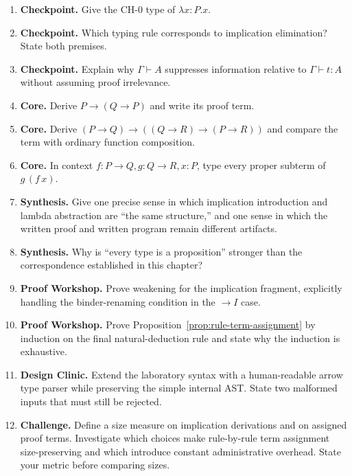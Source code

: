 \begin{enumerate}[label=\textbf{1.\arabic*.}]
\item \textbf{Checkpoint.} Give the $\mathrm{CH}\text{-}0$ type of $\lambda x{:}P.x$.
\item \textbf{Checkpoint.} Which typing rule corresponds to implication elimination? State both premises.
\item \textbf{Checkpoint.} Explain why $\Gamma\vdash A$ suppresses information relative to $\Gamma\vdash t:A$ without assuming proof irrelevance.
\item \textbf{Core.} Derive $P\to(Q\to P)$ and write its proof term.
\item \textbf{Core.} Derive $(P\to Q)\to((Q\to R)\to(P\to R))$ and compare the term with ordinary function composition.
\item \textbf{Core.} In context $f:P\to Q, g:Q\to R, x:P$, type every proper subterm of $g\,(f\,x)$.
\item \textbf{Synthesis.} Give one precise sense in which implication introduction and lambda abstraction are “the same structure,” and one sense in which the written proof and written program remain different artifacts.
\item \textbf{Synthesis.} Why is “every type is a proposition” stronger than the correspondence established in this chapter?
\item \textbf{Proof Workshop.} Prove weakening for the implication fragment, explicitly handling the binder-renaming condition in the $\to I$ case.
\item \textbf{Proof Workshop.} Prove Proposition~\ref{prop:rule-term-assignment} by induction on the final natural-deduction rule and state why the induction is exhaustive.
\item \textbf{Design Clinic.} Extend the laboratory syntax with a human-readable arrow type parser while preserving the simple internal AST. State two malformed inputs that must still be rejected.
\item \textbf{Challenge.} Define a size measure on implication derivations and on assigned proof terms. Investigate which choices make rule-by-rule term assignment size-preserving and which introduce constant administrative overhead. State your metric before comparing sizes.
\end{enumerate}
